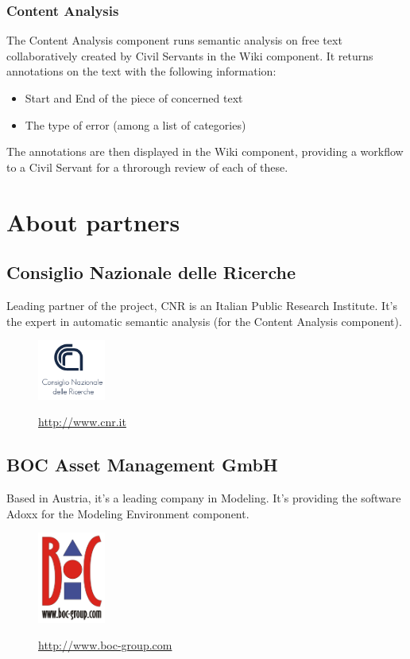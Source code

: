 \documentclass{learnpad}
\begin{document}
\subsection{Content Analysis}
The Content Analysis component runs semantic analysis on free text
collaboratively created by Civil Servants in the Wiki component.  It returns
annotations on the text with the following information:
\begin{itemize}
	\item Start and End of the piece of concerned text
	\item The type of error (among a list of categories)
\end{itemize}

The annotations are then displayed in the Wiki component, providing a workflow
to a Civil Servant for a throrough review of each of these.

\chapter{About partners}
\label{ch:partners}

\section{Consiglio Nazionale delle Ricerche}
Leading partner of the \learnpad project, CNR is an Italian Public Research
Institute.  It's the expert in automatic semantic analysis (for the Content
Analysis component).

\begin{figure}[!htp]
	\centering
	\includegraphics[width=6em,keepaspectratio]{figures/cnr.png}\par
	\url{http://www.cnr.it}
\end{figure}

\section{BOC Asset Management GmbH}
Based in Austria, it's a leading company in Modeling.  It's providing the
software Adoxx for the Modeling Environment component.

\begin{figure}[!htp]
	\centering
	\includegraphics[width=6em,keepaspectratio]{figures/boc-group.png}\par
	\url{http://www.boc-group.com}
\end{figure}
\end{document}
